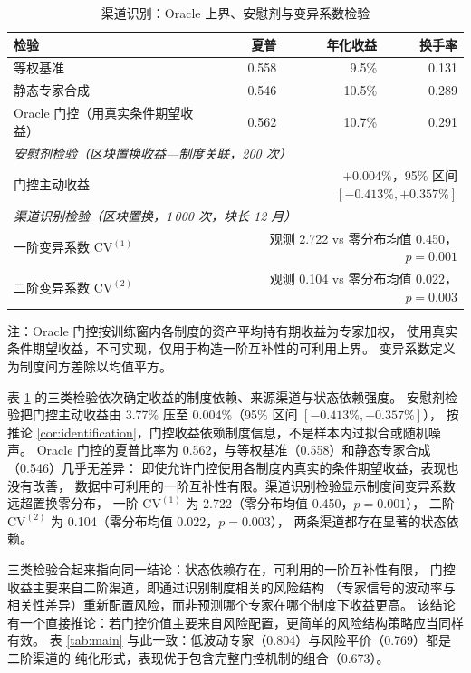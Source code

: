 \begin{table}[htbp]
\centering
\caption{渠道识别：Oracle 上界、安慰剂与变异系数检验}
\label{tab:oracle}
\begin{threeparttable}
\small
\begin{tabular}{lrrr}
\toprule
检验 & 夏普 & 年化收益 & 换手率 \\
\midrule
等权基准 & 0.558 & 9.5\% & 0.131 \\
静态专家合成 & 0.546 & 10.5\% & 0.289 \\
Oracle 门控（用真实条件期望收益） & 0.562 & 10.7\% & 0.291 \\
\midrule
\multicolumn{4}{l}{\textit{安慰剂检验（区块置换收益—制度关联，200 次）}} \\
门控主动收益 & \multicolumn{3}{r}{$+0.004\%$，95\% 区间 $[-0.413\%,+0.357\%]$} \\
\midrule
\multicolumn{4}{l}{\textit{渠道识别检验（区块置换，1\,000 次，块长 12 月）}} \\
一阶变异系数 $\mathrm{CV}^{(1)}$ & \multicolumn{3}{r}{观测 2.722 vs 零分布均值 0.450，$p=0.001$} \\
二阶变异系数 $\mathrm{CV}^{(2)}$ & \multicolumn{3}{r}{观测 0.104 vs 零分布均值 0.022，$p=0.003$} \\
\bottomrule
\end{tabular}
\begin{tablenotes}[flushleft]\footnotesize
\item 注：Oracle 门控按训练窗内各制度的资产平均持有期收益为专家加权，
使用真实条件期望收益，不可实现，仅用于构造一阶互补性的可利用上界。
变异系数定义为制度间方差除以均值平方。
\end{tablenotes}
\end{threeparttable}
\end{table}

表 \ref{tab:oracle} 的三类检验依次确定收益的制度依赖、来源渠道与状态依赖强度。
安慰剂检验把门控主动收益由 3.77\% 压至 0.004\%（95\% 区间 $[-0.413\%,+0.357\%]$），
按推论 \ref{cor:identification}，门控收益依赖制度信息，不是样本内过拟合或随机噪声。
Oracle 门控的夏普比率为 0.562，与等权基准（0.558）和静态专家合成（0.546）几乎无差异：
即使允许门控使用各制度内真实的条件期望收益，表现也没有改善，
数据中可利用的一阶互补性有限。渠道识别检验显示制度间变异系数远超置换零分布，
一阶 $\mathrm{CV}^{(1)}$ 为 2.722（零分布均值 0.450，$p=0.001$），
二阶 $\mathrm{CV}^{(2)}$ 为 0.104（零分布均值 0.022，$p=0.003$），
两条渠道都存在显著的状态依赖。

三类检验合起来指向同一结论：状态依赖存在，可利用的一阶互补性有限，
门控收益主要来自二阶渠道，即通过识别制度相关的风险结构
（专家信号的波动率与相关性差异）重新配置风险，而非预测哪个专家在哪个制度下收益更高。
该结论有一个直接推论：若门控价值主要来自风险配置，更简单的风险结构策略应当同样有效。
表 \ref{tab:main} 与此一致：低波动专家（0.804）与风险平价（0.769）都是二阶渠道的
纯化形式，表现优于包含完整门控机制的组合（0.673）。

